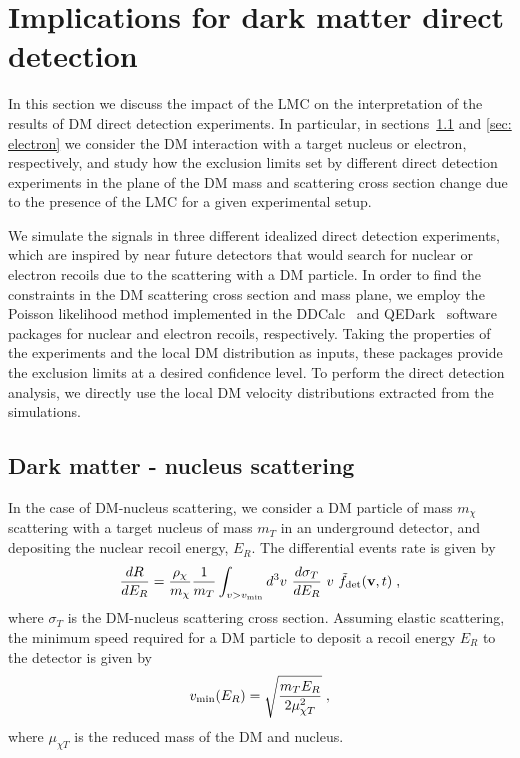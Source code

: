 \section{Implications for dark matter direct detection}
\label{sec: direct detection}

In this section we discuss the impact of the LMC on the interpretation of the results of DM direct detection experiments. In particular, in sections~\ref{sec: nuclear} and \ref{sec: electron} we consider the DM interaction with a target nucleus or electron, respectively, and study how the exclusion limits set by different direct detection experiments in the plane of the DM mass and scattering cross section change due to the presence of the LMC for a given experimental setup.

We simulate the signals in three different idealized direct detection experiments, which are inspired by near future detectors that would search for nuclear  or electron recoils due to the scattering with a DM particle. In order to find the constraints in the DM scattering cross section and mass plane, we employ the Poisson likelihood method  implemented in the {\rm DDCalc}~\cite{ddcalc} and {\rm QEDark}~\cite{QE, essig} software packages for nuclear and electron recoils, respectively. Taking the properties of the experiments and the local DM distribution as inputs, these packages provide the exclusion limits at a desired confidence level. To perform the direct detection analysis, we directly use the local DM velocity distributions extracted from the simulations.




\subsection{Dark matter - nucleus scattering}
\label{sec: nuclear}



In the case of DM-nucleus scattering, we consider a DM particle of mass $m_\chi$ scattering with a target nucleus of mass $m_T$ in an underground detector, and depositing the nuclear recoil energy, $E_R$. The differential events rate is given by
\begin{equation}
\frac{dR}{dE_R} = \frac{\rho_\chi}{m_\chi}\frac{1}{m_T} \int_{v>v_{\rm min}} d^3 v ~\frac{d\sigma_T}{d E_R}~v~\tilde{f}_{\rm det}({\bf v}, t)\; ,
\label{eq:difrate}
\end{equation}
where $\sigma_T$ is the DM-nucleus scattering cross section. 
Assuming elastic scattering, the minimum  speed required for a DM particle to deposit a recoil energy $E_R$ to the detector is given by
\begin{equation}
v_{\rm min}(E_R) = \sqrt{\frac{m_T E_R}{2 \mu^2_{\chi T}}}\; ,
\label{eq: vmin}
\end{equation}
where $\mu_{\chi T}$ is the reduced mass of the DM and nucleus.

